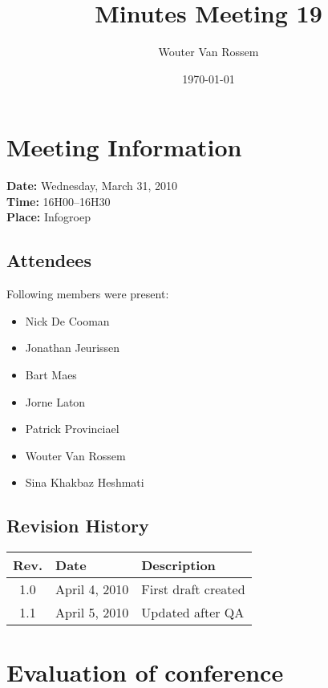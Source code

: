 \documentclass[a4paper, 12pt]{article}
\begin{document}
\title{Minutes Meeting 19}
\author{Wouter Van Rossem}
\date{\today}

\maketitle	
	\section{Meeting Information}
		\textbf{Date:} Wednesday, March 31, 2010\\
		\textbf{Time:} 16H00--16H30\\
		\textbf{Place:} Infogroep\\
		\subsection{Attendees}
Following members were present:
			\begin{itemize}
				\item Nick De Cooman
				\item Jonathan Jeurissen
				\item Bart Maes
				\item Jorne Laton
				\item Patrick Provinciael
				\item Wouter Van Rossem
				\item Sina Khakbaz Heshmati
			\end{itemize}

			 
			
		\subsection{Revision History}
			\begin{tabular}{c | l | l }
				\textbf{Rev.} & \textbf{Date} & \textbf{Description} \\
				\hline
				1.0 & April 4, 2010 & First draft created \\
				1.1 & April 5, 2010 & Updated after QA \\
			\end{tabular}		

	\section{Evaluation of conference}
\end{document}
